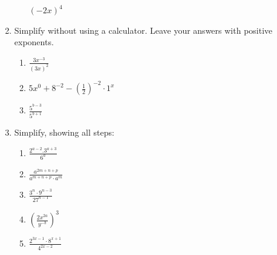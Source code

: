 \begin{enumerate}[noitemsep, label=\textbf{\arabic*}. ]
\begin{enumerate}[noitemsep, label=\textbf{\alph*}. ]
    \begin{math}{\left(-2x\right)}^{4}\end{math}
    \end{enumerate}
    \label{m38359*uid40}\item Simplify without using a calculator. Leave your answers with positive exponents.
\label{m38359*id68198}\begin{enumerate}[noitemsep, label=\textbf{\alph*}. ] 
            \label{m38359*uid41}\item \begin{math}\frac{3{x}^{-3}}{{\left(3x\right)}^{2}}\end{math}\newline
    \label{m38359*uid42}\item \begin{math}5{x}^{0}+{8}^{-2}-{\left(\frac{1}{2}\right)}^{-2}\ensuremath{\cdot}{1}^{x}\end{math}\label{m38359*uid43}\item \begin{math}\frac{{5}^{b-3}}{{5}^{b+1}}\end{math}
\end{enumerate}
                \label{m38359*uid44}\item Simplify, showing all steps:
\label{m38359*id68378}\begin{enumerate}[noitemsep, label=\textbf{\alph*}. ] 
            \label{m38359*uid45}\item \begin{math}\frac{{2}^{a-2}.{3}^{a+3}}{{6}^{a}}\end{math}\newline
    \label{m38359*uid46}\item \begin{math}\frac{{a}^{2m+n+p}}{{a}^{m+n+p}\ensuremath{\cdot}{a}^{m}}\end{math}\newline
    \label{m38359*uid47}\item \begin{math}\frac{{3}^{n}\ensuremath{\cdot}{9}^{n-3}}{{27}^{n-1}}\end{math}\newline
    \label{m38359*uid48}\item \begin{math}{\left(\frac{2{x}^{2a}}{{y}^{-b}}\right)}^{3}\end{math}\newline
    \newline
    \label{m38359*uid49}\item \begin{math}\frac{{2}^{3x-1}\ensuremath{\cdot}{8}^{x+1}}{{4}^{2x-2}}\end{math}\newline

\end{enumerate}
\end{enumerate}
